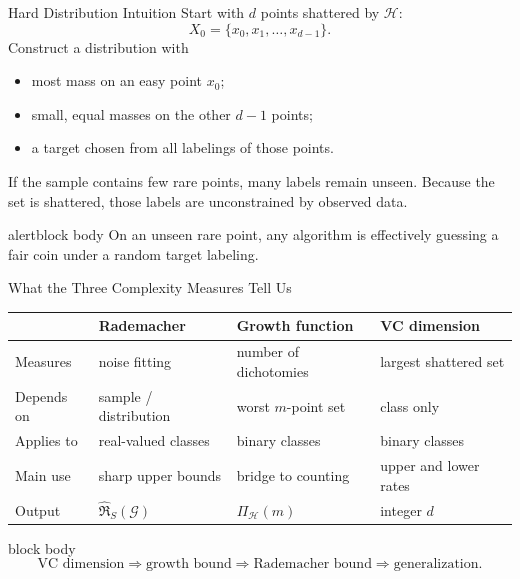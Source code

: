 \documentclass[aspectratio=169,10pt]{beamer}
\newcommand{\Hc}{\mathcal{H}}
\newcommand{\Gc}{\mathcal{G}}
\newcommand{\RadS}{\widehat{\mathfrak{R}}_S}
\newcommand{\PiH}{\Pi_{\Hc}}
\newcommand{\KeyBox}[1]{%
  \begin{beamercolorbox}[rounded=true,sep=0.22cm,wd=\linewidth]{block body}
    #1
  \end{beamercolorbox}%
}
\newcommand{\OrangeBox}[1]{%
  \begin{beamercolorbox}[rounded=true,sep=0.22cm,wd=\linewidth]{alertblock body}
    #1
  \end{beamercolorbox}%
}
\begin{document}
\begin{frame}[t]{Hard Distribution Intuition}
  \vspace{0.01cm}
  Start with $d$ points shattered by $\Hc$:
  \[
    X_0=\{x_0,x_1,\ldots,x_{d-1}\}.
  \]
  Construct a distribution with
  \begin{itemize}
    \setlength{\itemsep}{0.12cm}
    \item most mass on an easy point $x_0$;
    \item small, equal masses on the other $d-1$ points;
    \item a target chosen from all labelings of those points.
  \end{itemize}
  \vspace{0.05cm}
  If the sample contains few rare points, many labels remain unseen. Because the set is shattered, those labels are unconstrained by observed data.
  \vspace{0.06cm}
  \OrangeBox{On an unseen rare point, any algorithm is effectively guessing a fair coin under a random target labeling.}
\end{frame}



\begin{frame}[t]{What the Three Complexity Measures Tell Us}
  \vspace{0.01cm}
  {\scriptsize
  \renewcommand{\arraystretch}{1.12}
  \begin{center}
  \begin{tabular}{p{2.35cm}p{2.95cm}p{3.05cm}p{3.05cm}}
    \toprule
    & \textbf{Rademacher} & \textbf{Growth function} & \textbf{VC dimension}\\
    \midrule
    Measures & noise fitting & number of dichotomies & largest shattered set\\
    Depends on & sample / distribution & worst $m$-point set & class only\\
    Applies to & real-valued classes & binary classes & binary classes\\
    Main use & sharp upper bounds & bridge to counting & upper and lower rates\\
    Output & $\RadS(\Gc)$ & $\PiH(m)$ & integer $d$\\
    \bottomrule
  \end{tabular}
  \end{center}}
  \vspace{0.06cm}
  \KeyBox{\small 
  \[
    \text{VC dimension}\Rightarrow\text{growth bound}\Rightarrow\text{Rademacher bound}\Rightarrow\text{generalization}.
  \]
  }
\end{frame}
\end{document}
